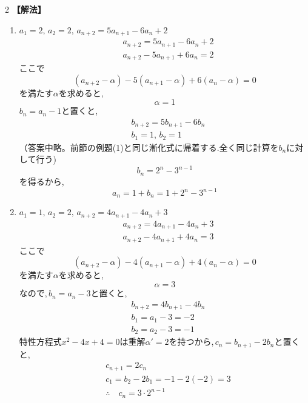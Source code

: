 \documentclass[dvipdfmx,a4paper,11pt,fleqn,openany]{jsbook}
\begin{document}
\begin{multicols*}{2}
      \noindent\textbf{【解法】}
      \begin{enumerate}[label=(\arabic*),parsep=3pt]
        \item $\displaystyle a_1=2,\,a_2=2,\, a_{n+2}=5a_{n+1}-6a_n+2$
              \begin{align*}
                &a_{n+2}=5a_{n+1}-6a_n+2\\
                &a_{n+2}-5a_{n+1}+6a_n=2
              \end{align*}
              ここで
              \[
                (a_{n+2}-\alpha)-5(a_{n+1}-\alpha)+6(a_n-\alpha)=0 
              \]
              を満たす$\alpha$を求めると,
              \[
                \alpha=1
              \]
              $b_n=a_n-1$と置くと,
              \begin{align*}
                &b_{n+2}=5b_{n+1}-6b_n\\
                &b_1=1,\, b_2=1
              \end{align*}
              （答案中略。前節の例題(1)と同じ漸化式に帰着する.全く同じ計算を$b_n$に対して行う)
              \[
                b_n=2^n-3^{n-1}
              \]
              を得るから,
              \[
                a_n=1+b_n=1+2^n-3^{n-1}
              \]
        \item $\displaystyle a_1=1,\,a_2=2,\, a_{n+2}=4a_{n+1}-4a_n+3$
              \begin{align*}
                &a_{n+2}=4a_{n+1}-4a_n+3\\
                &a_{n+2}-4a_{n+1}+4a_n=3
              \end{align*}
              ここで
              \[
                (a_{n+2}-\alpha)-4(a_{n+1}-\alpha)+4(a_n-\alpha)=0 
              \]
              を満たす$\alpha$を求めると,
              \[
                \alpha=3
              \]
              なので,\,$b_n=a_n-3$と置くと,
              \begin{align*}
                &b_{n+2}=4b_{n+1}-4b_n\\
                &b_1=a_1-3=-2\\
                &b_2=a_2-3=-1                
              \end{align*}
              特性方程式$x^2-4x+4=0$は重解$\alpha'=2$を持つから,\,$c_n=b_{n+1}-2b_n$と置くと,
              \begin{align*}
                &c_{n+1}=2c_n\\
                &c_1=b_2-2b_1=-1-2(-2)=3\\
                &\therefore \quad c_n=3\cdot2^{n-1}

\end{align*}
\end{enumerate}
\end{multicols*}
\end{document}
